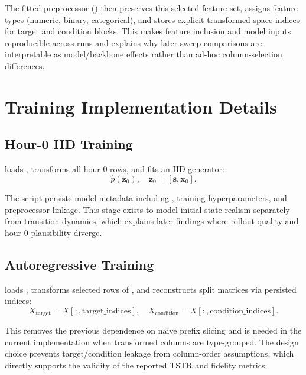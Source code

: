 The fitted preprocessor () then preserves this selected feature set, assigns feature types (numeric, binary, categorical), and stores explicit transformed-space indices for target and condition blocks.
This makes feature inclusion and model inputs reproducible across runs and explains why later sweep comparisons are interpretable as model/backbone effects rather than ad-hoc column-selection differences.

\section{Training Implementation Details}

\subsection{Hour-0 IID Training}

 loads , transforms all hour-0 rows, and fits an IID generator:
\begin{equation}
\hat{p}(\mathbf{z}_0), \quad \mathbf{z}_0=[\mathbf{s},\mathbf{x}_0].
\end{equation}

The script persists model metadata including , training hyperparameters, and preprocessor linkage.
This stage exists to model initial-state realism separately from transition dynamics, which explains later findings where rollout quality and hour-0 plausibility diverge.

\subsection{Autoregressive Training}

 loads , transforms selected rows of , and reconstructs split matrices via persisted indices:
\begin{equation}
X_{\text{target}} = X[:, \text{target\_indices}], \quad
X_{\text{condition}} = X[:, \text{condition\_indices}].
\end{equation}

This removes the previous dependence on naive prefix slicing and is needed in the current implementation when transformed columns are type-grouped.
The design choice prevents target/condition leakage from column-order assumptions, which directly supports the validity of the reported TSTR and fidelity metrics.

